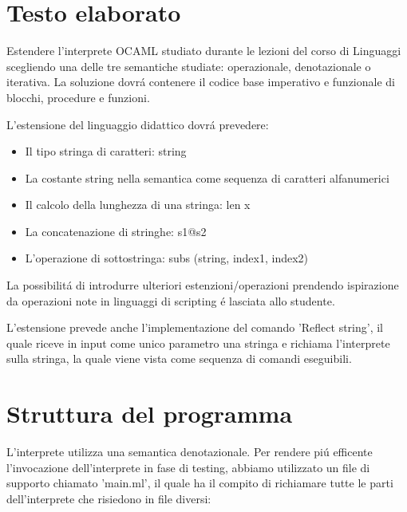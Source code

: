 \documentclass[a4paper,titlepage]{book}
\begin{document}
\pagestyle{plain}

\begin{frontespizio}
\Titoletto{}
\Sottotitolo{}
\end{frontespizio}

\tableofcontents
\clearpage
\thispagestyle{empty}

\chapter{Testo elaborato}
Estendere l'interprete OCAML studiato durante le lezioni del corso di Linguaggi scegliendo una delle tre semantiche studiate:
operazionale, denotazionale o iterativa.
La soluzione dovr\'a contenere il codice base imperativo e funzionale di blocchi, procedure e funzioni.

L'estensione del linguaggio didattico dovr\'a prevedere:
\begin{itemize}
\item Il tipo stringa di caratteri: string
\item La costante string nella semantica come sequenza di caratteri alfanumerici
\item Il calcolo della lunghezza di una stringa: len x
\item La concatenazione di stringhe: s1@s2
\item L'operazione di sottostringa: subs (string, index1, index2)
\end{itemize}

La possibilit\'a di introdurre ulteriori estenzioni/operazioni prendendo ispirazione da operazioni note in linguaggi di scripting
\'e lasciata allo studente.

L'estensione prevede anche l'implementazione del comando 'Reflect string', il quale riceve in input come unico parametro
una stringa e richiama l'interprete sulla stringa, la quale viene vista come sequenza di comandi eseguibili.

\clearpage
\thispagestyle{empty}

\chapter{Struttura del programma}
L'interprete utilizza una semantica denotazionale.
Per rendere pi\'u efficente l'invocazione dell'interprete in fase di testing, abbiamo utilizzato un file di supporto chiamato 'main.ml',
il quale ha il compito di richiamare tutte le parti dell'interprete che risiedono in file diversi:
\end{document}

